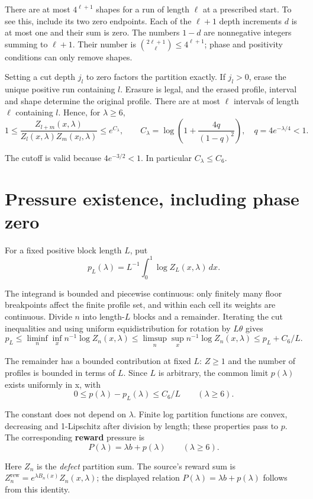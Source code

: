 \documentclass[11pt,letterpaper]{article}
\begin{document}
There are at most $4^{\ell+1}$ shapes for a run of length $\ell$ at a prescribed start. To see this, include its two zero endpoints. Each of the $\ell+1$ depth increments $d$ is at most one and their sum is zero. The numbers $1-d$ are nonnegative integers summing to $\ell+1$. Their number is $\binom{2\ell+1}{\ell}\le4^{\ell+1}$; phase and positivity conditions can only remove shapes.

Setting a cut depth $j_l$ to zero factors the partition exactly. If $j_l>0$, erase the unique positive run containing $l$. Erasure is legal, and the erased profile, interval and shape determine the original profile. There are at most $\ell$ intervals of length $\ell$ containing $l$. Hence, for $\lambda\ge6$,
\[
1\le\frac{Z_{l+m}(x,\lambda)}
 {Z_l(x,\lambda)Z_m(x_l,\lambda)}
\le e^{C_\lambda},\qquad
C_\lambda=\log\!\left(1+\frac{4q}{(1-q)^2}\right),\quad
q=4e^{-\lambda/4}<1.
\]

The cutoff is valid because $4e^{-3/2}<1$. In particular $C_\lambda\le C_6$.

\section{Pressure existence, including phase zero}

For a fixed positive block length $L$, put
\[
p_L(\lambda)=L^{-1}\int_0^1\log Z_L(x,\lambda)\,dx.
\]

The integrand is bounded and piecewise continuous: only finitely many floor breakpoints affect the finite profile set, and within each cell its weights are continuous. Divide $n$ into length-$L$ blocks and a remainder. Iterating the cut inequalities and using uniform equidistribution for rotation by $L\theta$ gives
\[
p_L\le\liminf_n\inf_x n^{-1}\log Z_n(x,\lambda)
\le\limsup_n\sup_x n^{-1}\log Z_n(x,\lambda)
\le p_L+C_6/L.
\]

The remainder has a bounded contribution at fixed $L$: $Z\ge1$ and the number of profiles is bounded in terms of $L$. Since $L$ is arbitrary, the common limit $p(\lambda)$ exists uniformly in x, with
\[
0\le p(\lambda)-p_L(\lambda)\le C_6/L\qquad(\lambda\ge6).
\]

The constant does not depend on $\lambda$. Finite log partition functions are convex, decreasing and 1-Lipschitz after division by length; these properties pass to $p$. The corresponding \textbf{reward} pressure is
\[
P(\lambda)=\lambda b+p(\lambda)\qquad(\lambda\ge6).
\]

Here $Z_n$ is the \emph{defect} partition sum. The source's reward sum is
$Z_n^{\mathrm{rew}}=e^{\lambda B_n(x)}Z_n(x,\lambda)$; the displayed relation
$P(\lambda)=\lambda b+p(\lambda)$ follows from this identity.
\end{document}
